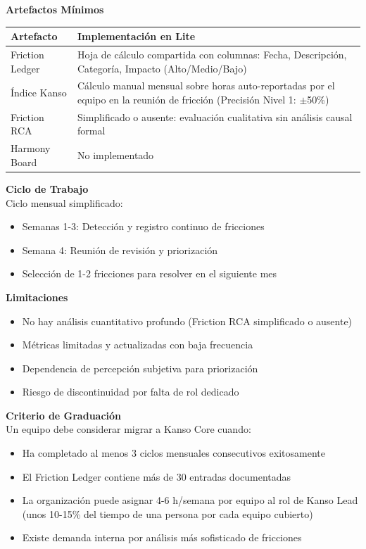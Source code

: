 \textbf{Artefactos Mínimos}
\begin{center}
\small
\begin{tabular}{|p{4cm}|p{9cm}|}
\hline
\textbf{Artefacto} & \textbf{Implementación en Lite} \\ \hline
Friction Ledger & Hoja de cálculo compartida con columnas: Fecha, Descripción, Categoría, Impacto (Alto/Medio/Bajo) \\ \hline
Índice Kanso & Cálculo manual mensual sobre horas auto-reportadas por el equipo en la reunión de fricción (Precisión Nivel 1: $\pm$50\%) \\ \hline
Friction RCA & Simplificado o ausente: evaluación cualitativa sin análisis causal formal \\ \hline
Harmony Board & No implementado \\ \hline
\end{tabular}
\end{center}

\textbf{Ciclo de Trabajo}\\
Ciclo mensual simplificado:
\begin{itemize}
    \item Semanas 1-3: Detección y registro continuo de fricciones
    \item Semana 4: Reunión de revisión y priorización
    \item Selección de 1-2 fricciones para resolver en el siguiente mes
\end{itemize}

\textbf{Limitaciones}
\begin{itemize}
    \item No hay análisis cuantitativo profundo (Friction RCA simplificado o ausente)
    \item Métricas limitadas y actualizadas con baja frecuencia
    \item Dependencia de percepción subjetiva para priorización
    \item Riesgo de discontinuidad por falta de rol dedicado
\end{itemize}

\textbf{Criterio de Graduación}\\
Un equipo debe considerar migrar a Kanso Core cuando:
\begin{itemize}
    \item Ha completado al menos 3 ciclos mensuales consecutivos exitosamente
    \item El Friction Ledger contiene más de 30 entradas documentadas
    \item La organización puede asignar 4-6 h/semana por equipo al rol de Kanso Lead (unos 10-15\% del tiempo de una persona por cada equipo cubierto)
    \item Existe demanda interna por análisis más sofisticado de fricciones
\end{itemize}

